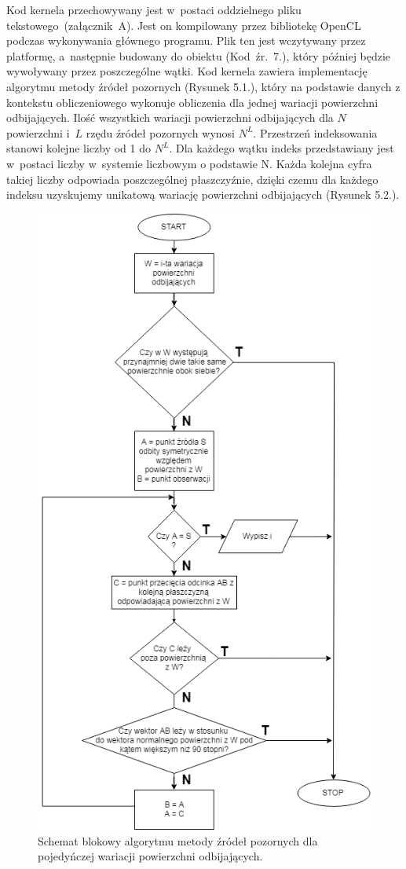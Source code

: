 Kod kernela przechowywany jest w~postaci oddzielnego pliku tekstowego~(załącznik~A). Jest on kompilowany przez bibliotekę OpenCL podczas wykonywania głównego programu. Plik ten jest wczytywany przez platformę, a~następnie budowany do obiektu (Kod~źr.~7.), który później będzie wywoływany przez poszczególne wątki. Kod kernela zawiera implementację algorytmu metody źródeł pozornych (Rysunek 5.1.), który na podstawie danych z kontekstu obliczeniowego wykonuje obliczenia dla jednej wariacji powierzchni odbijających. Ilość wszystkich wariacji powierzchni odbijających dla $N$ powierzchni i~$L$ rzędu źródeł pozornych wynosi $N^L$. Przestrzeń indeksowania stanowi kolejne liczby od 1 do $N^L$. Dla każdego wątku indeks przedstawiany jest w~postaci liczby w~systemie liczbowym o podstawie N. Każda kolejna cyfra takiej liczby odpowiada poszczególnej płaszczyźnie, dzięki czemu dla każdego indeksu uzyskujemy unikatową wariację powierzchni odbijających (Rysunek 5.2.).

\begin{figure}[H]
        \centering
                \centering
                \includegraphics[width=12cm]{kerneldiagram}
	\caption{Schemat blokowy algorytmu metody źródeł pozornych dla pojedyńczej wariacji powierzchni odbijających.}
\end{figure}

